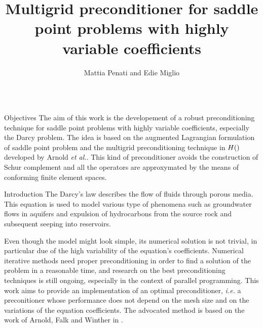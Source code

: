 \documentclass[final]{beamer}
\title{Multigrid preconditioner for saddle point problems with highly variable coefficients}
\author{Mattia Penati and Edie Miglio}
\institute{Politecnico di Milano - Department of Mathematics - MOX}
\newlength{\onecolwid}
\let\div\relax
\DeclareMathOperator{\div}{div}
\begin{document}

\setlength{\belowcaptionskip}{2ex} %
\setlength\belowdisplayshortskip{2ex} %

\begin{frame}[t] %

\begin{columns}[t] %

\begin{column}{\onecolwid} %

\begin{alertblock}{Objectives}
The aim of this work is the developement of a robust preconditioning technique
for saddle point problems with highly variable coefficients, especially the
Darcy problem. The idea is based on the augmented Lagrangian formulation of
saddle point problem and the multigrid preconditioning technique in $H(\div)$
developed by Arnold \textit{et al.}. This kind of preconditioner avoids the
construction of Schur complement and all the operators are approxymated by the
means of conforming finite element spaces.
\end{alertblock}

\begin{block}{Introduction}
The Darcy's law describes the flow of fluids through porous media. This
equation is used to model various type of phenomena such as groundwater flows
in aquifers and expulsion of hydrocarbons from the source rock and subsequent
seeping into reservoirs.

Even though the model might look simple, its numerical solution is not trivial,
in particular due of the high variability of the equation's coefficients.
Numerical iterative methods need proper preconditioning in order to find a
solution of the problem in a reasonable time, and research on the best
preconditioning techniques is still ongoing, especially in the context of
parallel programming. This work aims to provide an implementation of an optimal
preconditioner, \textit{i.e.} a preconitioner whose performance does not depend
on the mesh size and on the variations of the equation coefficients. The
advocated method is based on the work of Arnold, Falk and Winther in
\cite{arnold1997preconditioning}.


\end{block}
\end{column}
\end{columns}
\end{frame}
\end{document}

